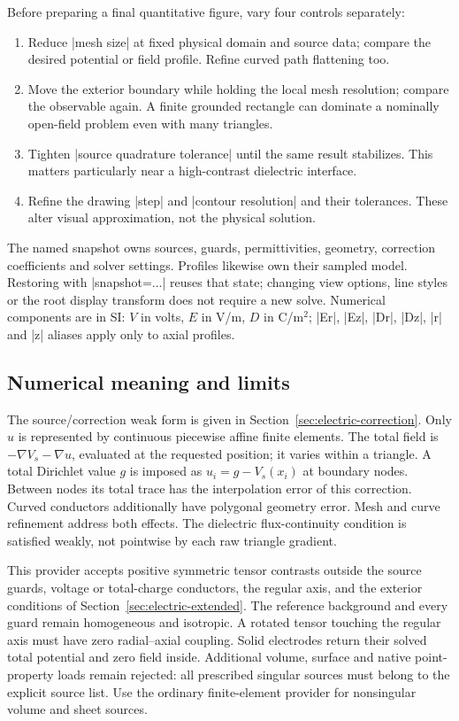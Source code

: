 Before preparing a final quantitative figure, vary four controls separately:
\begin{enumerate}
\item Reduce |mesh size| at fixed physical domain and source data; compare the
      desired potential or field profile. Refine curved path flattening too.
\item Move the exterior boundary while holding the local mesh resolution;
      compare the observable again. A finite grounded rectangle can dominate
      a nominally open-field problem even with many triangles.
\item Tighten |source quadrature tolerance| until the same result stabilizes.
      This matters particularly near a high-contrast dielectric interface.
\item Refine the drawing |step| and |contour resolution| and their tolerances.
      These alter visual approximation, not the physical solution.
\end{enumerate}
The named snapshot owns sources, guards, permittivities, geometry, correction
coefficients and solver settings. Profiles likewise own their sampled model.
Restoring with |snapshot=...| reuses that state; changing view options, line
styles or the root display transform does not require a new solve. Numerical
components are in SI: $V$ in volts, $E$ in V/m, $D$ in C/m$^2$; |Er|, |Ez|,
|Dr|, |Dz|, |r| and |z| aliases apply only to axial profiles.

\subsection{Numerical meaning and limits}
The source/correction weak form is given in Section~\ref{sec:electric-correction}.
Only $u$ is represented by continuous piecewise affine finite elements.
The total field is $-\nabla V_s-\nabla u$, evaluated at the requested position;
it varies within a triangle. A total Dirichlet value $g$ is imposed as
$u_i=g-V_s(x_i)$ at boundary nodes. Between nodes its total trace has the
interpolation error of this correction. Curved conductors additionally have
polygonal geometry error. Mesh and curve refinement address both effects.
The dielectric flux-continuity condition is satisfied weakly, not pointwise by
each raw triangle gradient.

This provider accepts positive symmetric tensor contrasts outside the source
guards, voltage or total-charge conductors, the regular axis, and the exterior
conditions of Section~\ref{sec:electric-extended}. The reference background
and every guard remain homogeneous and isotropic. A rotated tensor touching
the regular axis must have zero radial--axial coupling. Solid electrodes return
their solved total potential and zero field inside. Additional volume, surface
and native point-property loads remain rejected: all prescribed singular sources
must belong to the explicit source list. Use the ordinary finite-element
provider for nonsingular volume and sheet sources.

